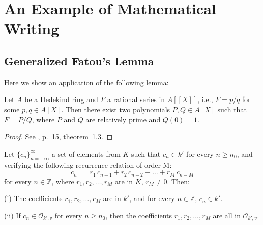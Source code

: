 \chapter{An Example of Mathematical Writing}
%

\section{Generalized Fatou's Lemma}
%

Here we show an application of the following lemma:

\begin{lem} \label{l:fatou}

Let $A$ be a Dedekind ring and $F$ a rational series 
in $A[[X]]$, i.e., $F = p/q$ for some 
$p, q \in A[X]$. Then there exist two polynomials 
$P, Q \in A[X]$ such that $F = P/Q$, 
where $P$ and $Q$ are relatively prime and 
$Q(0) = 1$.

\end{lem}

\begin{proof}
See \cite{bertin:psn}, p.~15, theorem~1.3.
\end{proof}

\begin{thm} \label{l:req}
Let $\{c_n\}_{n=-\infty}^{\infty}$ a set of 
elements from $K$ such that $c_n \in k'$ for every 
$n \geq n_0$, and verifying the following recurrence 
relation of order M:
\begin{equation}
c_n\ =\ r_1\,c_{n-1} + r_2\,c_{n-2} + \dots + r_M\,c_{n-M}
\end{equation}
for every $n \in \mathbb Z$, where $r_1,r_2,\dots,r_M$ are in 
$K$, $r_M \neq 0$. 
Then:

\item{(i)} The coefficients $r_1,r_2,\dots,r_M$ are in 
$k'$, and for every $n \in \mathbb Z$, $c_n \in k'$.

\item{(ii)} If $c_n \in \mathcal O_{k',v}$ 
for every $n \geq n_0$, then the coefficients 
$r_1,r_2,\dots,r_M$ are all in 
$\mathcal O_{k',v}$.

\end{thm}


